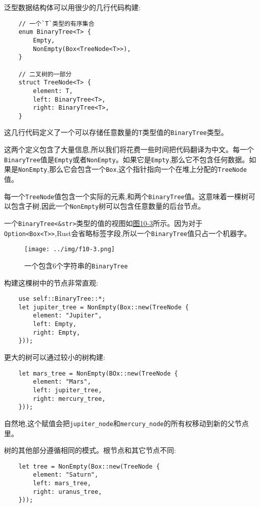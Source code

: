 泛型数据结构体可以用很少的几行代码构建:
\begin{verbatim}
    // 一个`T`类型的有序集合
    enum BinaryTree<T> {
        Empty,
        NonEmpty(Box<TreeNode<T>>),
    }

    // 二叉树的一部分
    struct TreeNode<T> {
        element: T,
        left: BinaryTree<T>,
        right: BinaryTree<T>,
    }
\end{verbatim}

这几行代码定义了一个可以存储任意数量的\texttt{T}类型值的\texttt{BinaryTree}类型。

这两个定义包含了大量信息,所以我们将花费一些时间把代码翻译为中文。每一个\texttt{BinaryTree}值是\texttt{Empty}或者\texttt{NonEmpty}。如果它是\texttt{Empty},那么它不包含任何数据。如果是\texttt{NonEmpty},那么它会包含一个\texttt{Box},这个指针指向一个在堆上分配的\texttt{TreeNode}值。

每一个\texttt{TreeNode}值包含一个实际的元素,和两个\texttt{BinaryTree}值。这意味着一棵树可以包含子树,因此一个\texttt{NonEmpty}树可以包含任意数量的后台节点。

一个\texttt{BinaryTree<\&str>}类型的值的视图如\hyperref[f10-3]{图10-3}所示。因为对于\texttt{Option<Box<T>>},Rust会省略标签字段,所以一个\texttt{BinaryTree}值只占一个机器字。

\begin{figure}[htbp]
    \centering
    \texttt{[image: ../img/f10-3.png]}
    \caption{一个包含6个字符串的\texttt{BinaryTree}}
    \label{f10-3}
\end{figure}

构建这棵树中的节点非常直观:
\begin{verbatim}
    use self::BinaryTree::*;
    let jupiter_tree = NonEmpty(Box::new(TreeNode {
        element: "Jupiter",
        left: Empty,
        right: Empty,
    }));
\end{verbatim}

更大的树可以通过较小的树构建:
\begin{verbatim}
    let mars_tree = NonEmpty(BOx::new(TreeNode {
        element: "Mars",
        left: jupiter_tree,
        right: mercury_tree,
    }));
\end{verbatim}

自然地,这个赋值会把\texttt{jupiter\_node}和\texttt{mercury\_node}的所有权移动到新的父节点里。

树的其他部分遵循相同的模式。根节点和其它节点不同:
\begin{verbatim}
    let tree = NonEmpty(Box::new(TreeNode {
        element: "Saturn",
        left: mars_tree,
        right: uranus_tree,
    }));
\end{verbatim}

